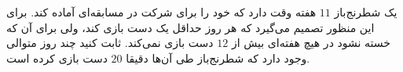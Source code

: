     \p 
یک شطرنج‌باز
$11$
هفته وقت دارد که خود را برای شرکت در مسابقه‌ای آماده کند. برای این منظور تصمیم می‌گیرد که هر روز حداقل یک دست بازی کند، ولی برای آن که خسته نشود در هیچ هفته‌ای بیش از
$12$
دست بازی نمی‌کند. ثابت کنید چند روز متوالی وجود دارد که شطرنج‌باز طی آن‌ها دقیقا
$20$
دست بازی کرده است.